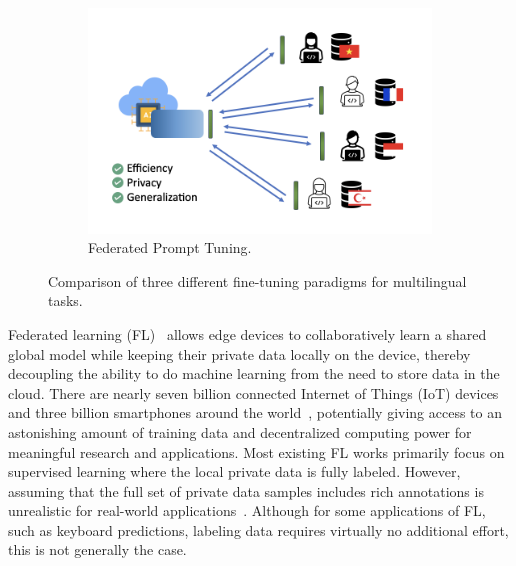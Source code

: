 \documentclass[withindex,glossary,firstyr]{cam-thesis}
\begin{document}
\begin{figure}
    \begin{minipage}{0.49\linewidth}
        \begin{subfigure}[b]{1.1\linewidth}
            \includegraphics[width=\linewidth]{3.jpg}
            \caption{Federated Prompt Tuning.}
            \label{fig:c}
        \end{subfigure}
    \end{minipage}
    \caption{Comparison of three different fine-tuning paradigms for multilingual tasks. }
    \vspace{-0.5cm}%
    \label{fig:images}
    
\end{figure}
Federated learning (FL)~\citep{fedavg} allows edge devices to collaboratively learn a shared global model while keeping their private data locally on the device, thereby decoupling the ability to do machine learning from the need to store data in the cloud. There are nearly seven billion connected Internet of Things (IoT) devices and three billion smartphones around the world~\citep{lim2020federated}, potentially giving access to an astonishing amount of training data and decentralized computing power for meaningful research and applications. Most existing FL works primarily focus on supervised learning where the local private data is fully labeled. However, assuming that the full set of private data samples includes rich annotations is unrealistic for real-world applications~\citep{fedmatch, semifl, jin2020towards,yang2021federated}. 
Although for some applications of FL, such as keyboard predictions, labeling data requires virtually no additional effort, this is not generally the case. 
\end{document}
